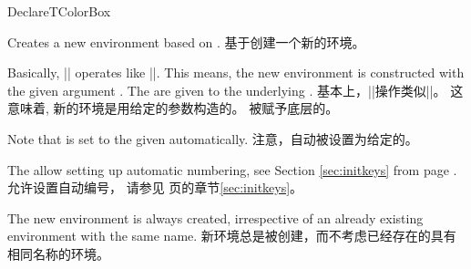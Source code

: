 \begin{docCommand}{DeclareTColorBox}{}
\begin{stripedbox}
Creates a new environment  based on .
\tcblower
基于创建一个新的环境。
\end{stripedbox}

\begin{stripedbox}
Basically, |\DeclareTColorBox| operates like |\DeclareDocumentEnvironment|. This means,
the new environment  is constructed with the given argument .
The  are given to the underlying .
\tcblower
基本上，|\DeclareTColorBox|操作类似|\DeclareDocumentEnvironment|。%
这意味着,%
新的环境是用给定的参数构造的。%
被赋予底层的。
\end{stripedbox}

\begin{stripedbox}
Note that  is set to the given 
automatically.
\tcblower
注意，自动被设置为给定的。
\end{stripedbox}

\begin{stripedbox}
The  allow setting up automatic numbering,
see Section \ref{sec:initkeys} from page \pageref{sec:initkeys}.
\tcblower
{}允许设置自动编号，%
请参见 \pageref{sec:initkeys}页的章节\ref{sec:initkeys}。
\end{stripedbox}

\begin{stripedbox}
The new environment is always created, irrespective of an already existing
environment with the same name.
\tcblower
新环境总是被创建，而不考虑已经存在的具有相同名称的环境。
\end{stripedbox}

\end{docCommand}
